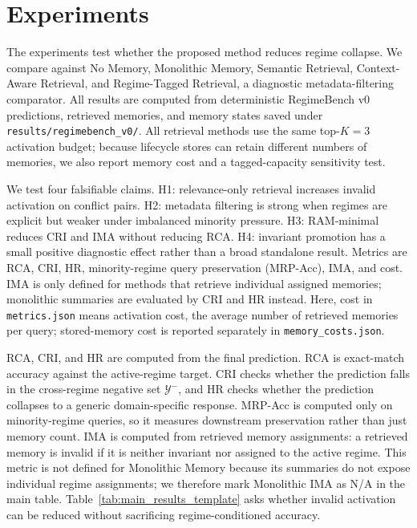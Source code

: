 \documentclass{article} %
\begin{document}
\section{Experiments}
\label{sec:experiments}

The experiments test whether the proposed method reduces regime collapse.
We compare against No Memory, Monolithic Memory, Semantic Retrieval, Context-Aware Retrieval, and Regime-Tagged Retrieval, a diagnostic metadata-filtering comparator.
All results are computed from deterministic RegimeBench v0 predictions, retrieved memories, and memory states saved under \texttt{results/regimebench\_v0/}.
All retrieval methods use the same top-$K=3$ activation budget; because lifecycle stores can retain different numbers of memories, we also report memory cost and a tagged-capacity sensitivity test.

We test four falsifiable claims.
H1: relevance-only retrieval increases invalid activation on conflict pairs.
H2: metadata filtering is strong when regimes are explicit but weaker under imbalanced minority pressure.
H3: RAM-minimal reduces CRI and IMA without reducing RCA.
H4: invariant promotion has a small positive diagnostic effect rather than a broad standalone result.
Metrics are RCA, CRI, HR, minority-regime query preservation (MRP-Acc), IMA, and cost.
IMA is only defined for methods that retrieve individual assigned memories; monolithic summaries are evaluated by CRI and HR instead.
Here, cost in \texttt{metrics.json} means activation cost, the average number of retrieved memories per query; stored-memory cost is reported separately in \texttt{memory\_costs.json}.

RCA, CRI, and HR are computed from the final prediction.
RCA is exact-match accuracy against the active-regime target.
CRI checks whether the prediction falls in the cross-regime negative set $\mathcal{Y}^{-}$, and HR checks whether the prediction collapses to a generic domain-specific response.
MRP-Acc is computed only on minority-regime queries, so it measures downstream preservation rather than just memory count.
IMA is computed from retrieved memory assignments: a retrieved memory is invalid if it is neither invariant nor assigned to the active regime.
This metric is not defined for Monolithic Memory because its summaries do not expose individual regime assignments; we therefore mark Monolithic IMA as N/A in the main table.
Table~\ref{tab:main_results_template} asks whether invalid activation can be reduced without sacrificing regime-conditioned accuracy.
\end{document}
